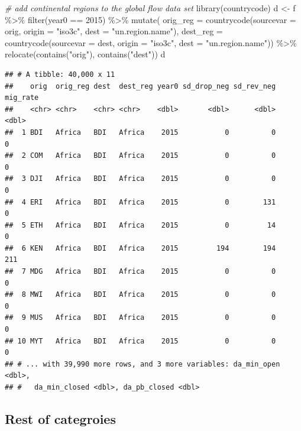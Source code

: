 \documentclass[
]{book}
\newenvironment{Shaded}{\begin{snugshade}}{\end{snugshade}}
\newcommand{\AttributeTok}[1]{\textcolor[rgb]{0.77,0.63,0.00}{#1}}
\newcommand{\CommentTok}[1]{\textcolor[rgb]{0.56,0.35,0.01}{\textit{#1}}}
\newcommand{\DecValTok}[1]{\textcolor[rgb]{0.00,0.00,0.81}{#1}}
\newcommand{\FunctionTok}[1]{\textcolor[rgb]{0.00,0.00,0.00}{#1}}
\newcommand{\NormalTok}[1]{#1}
\newcommand{\OtherTok}[1]{\textcolor[rgb]{0.56,0.35,0.01}{#1}}
\newcommand{\SpecialCharTok}[1]{\textcolor[rgb]{0.00,0.00,0.00}{#1}}
\newcommand{\StringTok}[1]{\textcolor[rgb]{0.31,0.60,0.02}{#1}}
\begin{document}
\begin{Shaded}
\begin{Highlighting}[]
\CommentTok{\# add continental regions to the global flow data set}
\FunctionTok{library}\NormalTok{(countrycode)}
\NormalTok{d }\OtherTok{\textless{}{-}}\NormalTok{ f }\SpecialCharTok{\%\textgreater{}\%} 
  \FunctionTok{filter}\NormalTok{(year0 }\SpecialCharTok{==} \DecValTok{2015}\NormalTok{) }\SpecialCharTok{\%\textgreater{}\%}
  \FunctionTok{mutate}\NormalTok{(}
    \AttributeTok{orig\_reg =} 
      \FunctionTok{countrycode}\NormalTok{(}\AttributeTok{sourcevar =}\NormalTok{ orig, }\AttributeTok{origin =} \StringTok{"iso3c"}\NormalTok{, }\AttributeTok{dest =} \StringTok{"un.region.name"}\NormalTok{),}
    \AttributeTok{dest\_reg =} 
      \FunctionTok{countrycode}\NormalTok{(}\AttributeTok{sourcevar =}\NormalTok{ dest, }\AttributeTok{origin =} \StringTok{"iso3c"}\NormalTok{, }\AttributeTok{dest =} \StringTok{"un.region.name"}\NormalTok{)) }\SpecialCharTok{\%\textgreater{}\%}
  \FunctionTok{relocate}\NormalTok{(}\FunctionTok{contains}\NormalTok{(}\StringTok{"orig"}\NormalTok{), }\FunctionTok{contains}\NormalTok{(}\StringTok{"dest"}\NormalTok{))}
\NormalTok{d}
\end{Highlighting}
\end{Shaded}

\begin{verbatim}
## # A tibble: 40,000 x 11
##    orig  orig_reg dest  dest_reg year0 sd_drop_neg sd_rev_neg mig_rate
##    <chr> <chr>    <chr> <chr>    <dbl>       <dbl>      <dbl>    <dbl>
##  1 BDI   Africa   BDI   Africa    2015           0          0        0
##  2 COM   Africa   BDI   Africa    2015           0          0        0
##  3 DJI   Africa   BDI   Africa    2015           0          0        0
##  4 ERI   Africa   BDI   Africa    2015           0        131        0
##  5 ETH   Africa   BDI   Africa    2015           0         14        0
##  6 KEN   Africa   BDI   Africa    2015         194        194      211
##  7 MDG   Africa   BDI   Africa    2015           0          0        0
##  8 MWI   Africa   BDI   Africa    2015           0          0        0
##  9 MUS   Africa   BDI   Africa    2015           0          0        0
## 10 MYT   Africa   BDI   Africa    2015           0          0        0
## # ... with 39,990 more rows, and 3 more variables: da_min_open <dbl>,
## #   da_min_closed <dbl>, da_pb_closed <dbl>
\end{verbatim}

\hypertarget{rest-of-categroies-3}{%
\subsection{Rest of categroies}\label{rest-of-categroies-3}}
\end{document}
